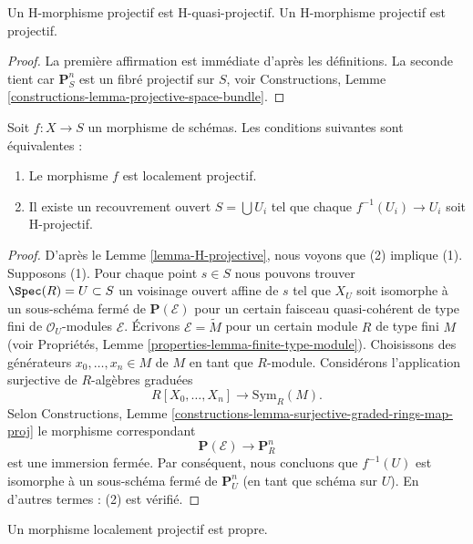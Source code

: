 \begin{lemma}
\label{lemma-H-projective}
Un H-morphisme projectif est H-quasi-projectif. Un
H-morphisme projectif est projectif.
\end{lemma}

\begin{proof}
La première affirmation est immédiate d'après les
définitions. La seconde tient car $\mathbf{P}^n_S$ est un fibré projectif
sur $S$, voir Constructions, Lemme \ref{constructions-lemma-projective-space-bundle}.
\end{proof}

\begin{lemma}
\label{lemma-characterize-locally-projective}
Soit $f : X \to S$ un morphisme de schémas. Les conditions
suivantes sont équivalentes :
\begin{enumerate}
\item Le morphisme $f$ est localement projectif.
\item Il existe un recouvrement ouvert $S = \bigcup U_i$ tel
que chaque $f^{-1}(U_i) \to U_i$ soit H-projectif.
\end{enumerate}
\end{lemma}

\begin{proof}
D'après le Lemme \ref{lemma-H-projective}, nous voyons que (2) implique (1). Supposons (1).
Pour chaque point $s \in S$ nous pouvons trouver $\Spec(R) = U \subset S$ un
voisinage ouvert affine de $s$ tel que $X_U$ soit isomorphe
à un sous-schéma fermé de $\mathbf{P}(\mathcal{E})$ pour un certain faisceau quasi-cohérent
de type fini de $\mathcal{O}_U$-modules $\mathcal{E}$. Écrivons $\mathcal{E} = \widetilde{M}$
pour un certain module $R$ de type fini $M$
(voir Propriétés,
Lemme \ref{properties-lemma-finite-type-module}). Choisissons des générateurs $x_0, \ldots, x_n \in M$
de $M$ en tant que $R$-module. Considérons l'application
surjective de $R$-algèbres graduées
$$
R[X_0, \ldots, X_n] \longrightarrow \text{Sym}_R(M).
$$
Selon Constructions,
Lemme \ref{constructions-lemma-surjective-graded-rings-map-proj} le morphisme
correspondant
$$
\mathbf{P}(\mathcal{E}) \to \mathbf{P}^n_R
$$
est une immersion fermée. Par conséquent, nous concluons que $f^{-1}(U)$ est isomorphe à
un sous-schéma fermé de $\mathbf{P}^n_U$ (en tant que schéma sur $U$). En d'autres
termes : (2) est vérifié.
\end{proof}

\begin{lemma}
\label{lemma-locally-projective-proper}
Un morphisme localement projectif est propre.
\end{lemma}

